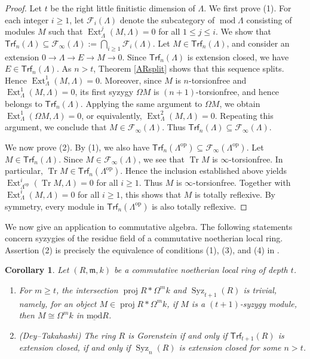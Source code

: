 \documentclass{amsart}
\newtheorem{cor}[thm]{Corollary}
\theoremstyle{definition}
\theoremstyle{remark}
\numberwithin{equation}{thm}
\def\Ext{\operatorname{Ext}}
\def\ge{\geqslant}
\def\le{\leqslant}
\def\lmod{\operatorname{\underline{mod}}}
\def\m{\mathfrak{m}}
\def\mod{\operatorname{mod}}
\def\proj{\operatorname{proj}}
\def\syz{\Omega}
\def\Syz{\operatorname{Syz}}
\def\Trf{\mathsf{Trf}}
\def\tr{\operatorname{Tr}}
\begin{document}
\begin{proof}
Let $t$ be the right little finitistic dimension of $\Lambda$. We first prove (1).
For each integer $i\ge1$, let $\mathcal{F}_i(\Lambda)$ denote the subcategory of $\mod\Lambda$ consisting of modules $M$ such that $\Ext^j_\Lambda(M,\Lambda)=0$ for all $1\le j\le i$.
We show that $\Trf_n(\Lambda)\subseteq\mathcal{F}_\infty(\Lambda):=\bigcap_{i\ge1}\mathcal{F}_i(\Lambda)$.
Let $M\in\Trf_n(\Lambda)$, and consider an extension $0\to\Lambda\to E\to M\to0$.
Since $\Trf_n(\Lambda)$ is extension closed, we have $E\in\Trf_n(\Lambda)$.
As $n>t$, Theorem \ref{ARsplit} shows that this sequence splits. Hence $\Ext^1_\Lambda(M,\Lambda)=0$.
Moreover, since $M$ is $n$-torsionfree and $\Ext^1_\Lambda(M,\Lambda)=0$, its first syzygy $\syz M$ is $(n+1)$-torsionfree, and hence belongs to $\Trf_n(\Lambda)$.
Applying the same argument to $\syz M$, we obtain $\Ext^1_\Lambda(\syz M,\Lambda)=0$, or equivalently, $\Ext^2_\Lambda(M,\Lambda)=0$.
Repeating this argument, we conclude that $M\in\mathcal{F}_\infty(\Lambda)$.
Thus $\Trf_n(\Lambda)\subseteq\mathcal{F}_\infty(\Lambda)$.

We now prove (2).
By (1), we also have $\Trf_n(\Lambda^{\mathrm{op}})\subseteq\mathcal{F}_\infty(\Lambda^{\mathrm{op}})$.
Let $M\in\Trf_n(\Lambda)$.
Since $M\in\mathcal{F}_\infty(\Lambda)$, we see that $\tr M$ is $\infty$-torsionfree.
In particular, $\tr M\in\Trf_n(\Lambda^{\mathrm{op}})$.
Hence the inclusion established above yields $\Ext^i_{\Lambda^{\mathrm{op}}}(\tr M,\Lambda)=0$ for all $i\ge1$.
Thus $M$ is $\infty$-torsionfree.
Together with $\Ext^i_\Lambda(M,\Lambda)=0$ for all $i\ge1$, this shows that $M$ is totally reflexive.
By symmetry, every module in $\Trf_n(\Lambda^{\mathrm{op}})$ is also totally reflexive.
\end{proof}

We now give an application to commutative algebra. The following statements concern syzygies of the residue field of a commutative noetherian local ring. Assertion (2) is precisely the equivalence of conditions (1), (3), and (4) in \cite[Theorem 1.2]{DT}.

\begin{cor}\label{syzkinter}
Let $(R,\m,k)$ be a commutative noetherian local ring of depth $t$.
\begin{enumerate}[\rm(1)]
   \item For $m\ge t$, the intersection $\proj R\ast \syz^{m}k$ and $\Syz_{t+1}(R)$ is trivial, namely, for an object $M\in\proj R\ast \syz^{m}k$, if $M$ is a $(t+1)$-syzygy module, then $M\cong \syz^m k$ in $\lmod R$.
   \item \textup{(Dey--Takahashi)} The ring $R$ is Gorenstein if and only if $\Trf_{t+1}(R)$ is extension closed, if and only if $\Syz_{n}(R)$ is extension closed for some $n>t$.
\end{enumerate}
\end{cor}
\end{document}
